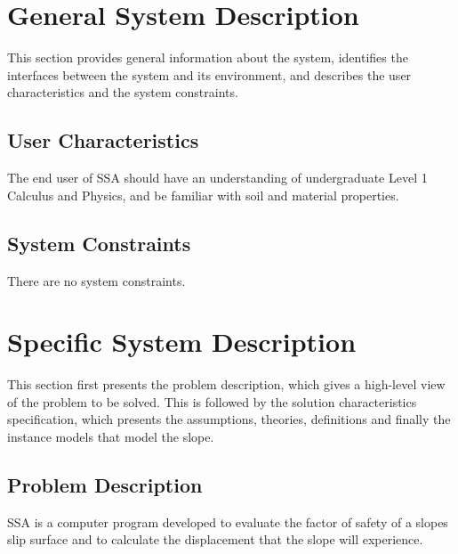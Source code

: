 \documentclass[12pt]{article}
\begin{document}
\section{General System Description}
\label{Sec:GSD}
This section provides general information about the system, identifies the interfaces between the system and its environment, and describes the user characteristics and the system constraints.
\subsection{User Characteristics}
\label{Sec:UC}
The end user of SSA should have an understanding of undergraduate Level 1 Calculus and Physics, and be familiar with soil and material properties.
\subsection{System Constraints}
\label{Sec:SC}
There are no system constraints.
\section{Specific System Description}
\label{Sec:SSD}
This section first presents the problem description, which gives a high-level view of the problem to be solved.  This is followed by the solution characteristics specification, which presents the assumptions, theories, definitions and finally the instance models that model the slope.
\subsection{Problem Description}
\label{Sec:PD}
SSA is a computer program developed to evaluate the factor of safety of a slopes slip surface and to calculate the displacement that the slope will experience.
\end{document}

